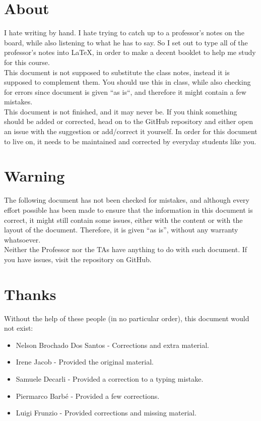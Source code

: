 \section*{About}
I hate writing by hand. I hate trying to catch up to a professor's notes on the board, while also listening to what he has to say. So I set out to type all of the professor's notes into \LaTeX, in order to make a decent booklet to help me study for this course.\\

This document is not supposed to substitute the class notes, instead it is supposed to complement them. You should use this in class, while also checking for errors since document is given ``as is``, and therefore it might contain a few mistakes.\\

This document is not finished, and it may never be. If you think something should be added or corrected, head on to the GitHub repository and either open an issue with the suggestion or add/correct it yourself. In order for this document to live on, it needs to be maintained and corrected by everyday students like you.

\section*{Warning}
The following document has not been checked for mistakes, and although every effort possible has been made to ensure that the information in this document is correct, it might still contain some issues, either with the content or with the layout of the document. Therefore, it is given ``as is'', without any warranty whatsoever. \\

Neither the Professor nor the TAs have anything to do with such document. If you have issues, visit the repository on GitHub.

\section*{Thanks}
Without the help of these people (in no particular order), this document would not exist:
\begin{itemize}
\item Nelson Brochado Dos Santos - Corrections and extra material.
\item Irene Jacob - Provided the original material.
\item Samuele Decarli - Provided a correction to a typing mistake.
\item Piermarco Barb\'{e} - Provided a few corrections.
\item Luigi Frunzio - Provided corrections and missing material.
\end{itemize}	


